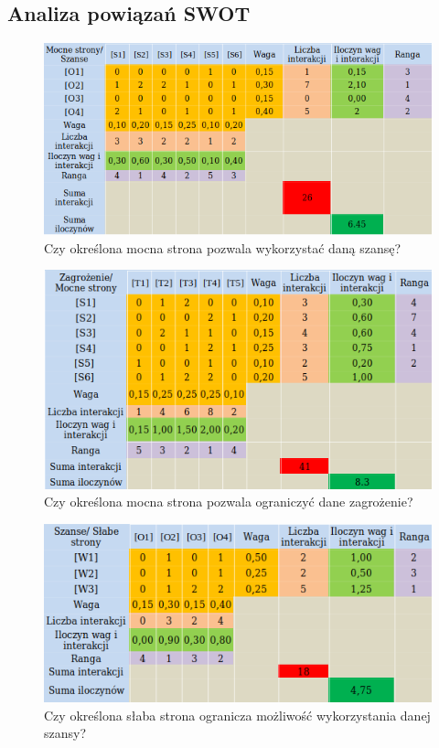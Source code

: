 \documentclass[12pt]{article}
\begin{document}
\subsection{Analiza powiązań SWOT}
\begin{figure}[H]
	\centering
	\includegraphics[scale=1.0]{img/swot2.png}
	\caption{Czy określona mocna strona pozwala wykorzystać daną szansę?}
\end{figure}
\begin{figure}[H]
	\centering
	\includegraphics[scale=1.1]{img/swot3.png}
	\caption{Czy określona mocna strona pozwala ograniczyć dane zagrożenie?}
\end{figure}
\begin{figure}[H]
	\centering
	\includegraphics[scale=1.1]{img/swot4.png}
	\caption{Czy określona słaba strona ogranicza możliwość wykorzystania danej szansy?}
\end{figure}
\end{document}
